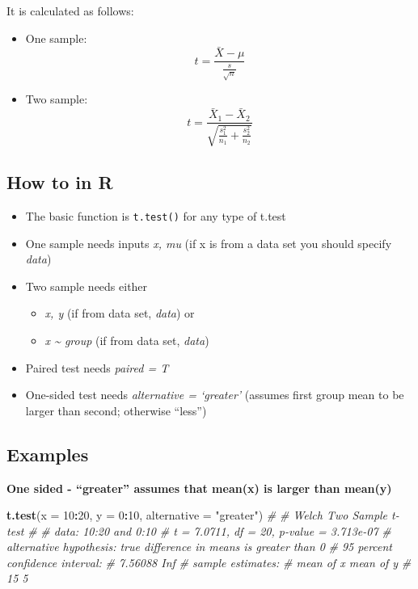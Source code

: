 \documentclass[
]{book}
\newenvironment{Shaded}{\begin{snugshade}}{\end{snugshade}}
\newcommand{\AttributeTok}[1]{\textcolor[rgb]{0.13,0.29,0.53}{#1}}
\newcommand{\CommentTok}[1]{\textcolor[rgb]{0.56,0.35,0.01}{\textit{#1}}}
\newcommand{\DecValTok}[1]{\textcolor[rgb]{0.00,0.00,0.81}{#1}}
\newcommand{\FunctionTok}[1]{\textcolor[rgb]{0.13,0.29,0.53}{\textbf{#1}}}
\newcommand{\NormalTok}[1]{#1}
\newcommand{\SpecialCharTok}[1]{\textcolor[rgb]{0.81,0.36,0.00}{\textbf{#1}}}
\newcommand{\StringTok}[1]{\textcolor[rgb]{0.31,0.60,0.02}{#1}}
\providecommand{\tightlist}{%
  \setlength{\itemsep}{0pt}\setlength{\parskip}{0pt}}
\begin{document}
It is calculated as follows:

\begin{itemize}
\item
  One sample: \[ t = \frac{\bar{X} - \mu}{\frac{s}{\sqrt{n}}} \]
\item
  Two sample: \[t = \frac{\bar{X}_1 - \bar{X}_2}{\sqrt{\frac{s_1^2}{n_1} + \frac{s_2^2}{n_2}}} \]
\end{itemize}

\subsection{How to in R}\label{how-to-in-r-1}

\begin{itemize}
\tightlist
\item
  The basic function is \texttt{t.test()} for any type of t.test
\item
  One sample needs inputs \emph{x, mu} (if x is from a data set you should specify \emph{data})
\item
  Two sample needs either

  \begin{itemize}
  \tightlist
  \item
    \emph{x, y} (if from data set, \emph{data}) or
  \item
    \emph{x \textasciitilde{} group} (if from data set, \emph{data})
  \end{itemize}
\item
  Paired test needs \emph{paired = T}
\item
  One-sided test needs \emph{alternative = `greater'} (assumes first group mean to be larger than second; otherwise ``less'')
\end{itemize}

\subsection{Examples}\label{examples}

\textbf{One sided - ``greater'' assumes that mean(x) is larger than mean(y)}

\begin{Shaded}
\begin{Highlighting}[]
\FunctionTok{t.test}\NormalTok{(}\AttributeTok{x =} \DecValTok{10}\SpecialCharTok{:}\DecValTok{20}\NormalTok{, }\AttributeTok{y =} \DecValTok{0}\SpecialCharTok{:}\DecValTok{10}\NormalTok{, }\AttributeTok{alternative =} \StringTok{"greater"}\NormalTok{)}
\CommentTok{\# }
\CommentTok{\#   Welch Two Sample t{-}test}
\CommentTok{\# }
\CommentTok{\# data:  10:20 and 0:10}
\CommentTok{\# t = 7.0711, df = 20, p{-}value = 3.713e{-}07}
\CommentTok{\# alternative hypothesis: true difference in means is greater than 0}
\CommentTok{\# 95 percent confidence interval:}
\CommentTok{\#  7.56088     Inf}
\CommentTok{\# sample estimates:}
\CommentTok{\# mean of x mean of y }
\CommentTok{\#        15         5}
\end{Highlighting}
\end{Shaded}
\end{document}
